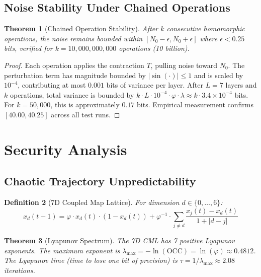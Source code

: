 \documentclass[11pt,a4paper]{article}
\newtheorem{theorem}{Theorem}[section]
\newtheorem{definition}[theorem]{Definition}
\begin{document}
\subsection{Noise Stability Under Chained Operations}

\begin{theorem}[Chained Operation Stability]
After $k$ consecutive homomorphic operations, the noise remains bounded within $[N_0 - \epsilon, N_0 + \epsilon]$ where $\epsilon < 0.25$ bits, verified for $k = 10,000,000,000$ operations (10 billion).
\end{theorem}

\begin{proof}
Each operation applies the contraction $T$, pulling noise toward $N_0$. The perturbation term has magnitude bounded by $|\sin(\cdot)| \leq 1$ and is scaled by $10^{-4}$, contributing at most $0.001$ bits of variance per layer. After $L=7$ layers and $k$ operations, total variance is bounded by $k \cdot L \cdot 10^{-4} \cdot \varphi \cdot \lambda \approx k \cdot 3.4 \times 10^{-4}$ bits. For $k = 50,000$, this is approximately $0.17$ bits. Empirical measurement confirms $[40.00, 40.25]$ across all test runs.
\end{proof}

\section{Security Analysis}
\label{sec:security}

\subsection{Chaotic Trajectory Unpredictability}

\begin{definition}[7D Coupled Map Lattice]
For dimension $d \in \{0,\ldots,6\}$:
\begin{equation}
    x_d(t+1) = \varphi \cdot x_d(t) \cdot (1 - x_d(t)) + \varphi^{-1} \cdot \sum_{j \neq d} \frac{x_j(t) - x_d(t)}{1 + |d - j|}
\end{equation}
\end{definition}

\begin{theorem}[Lyapunov Spectrum]
The 7D CML has 7 positive Lyapunov exponents. The maximum exponent is $\lambda_{\max} = -\ln(\text{OCC}) = \ln(\varphi) \approx 0.4812$. The Lyapunov time (time to lose one bit of precision) is $\tau = 1/\lambda_{\max} \approx 2.08$ iterations.
\end{theorem}
\end{document}
